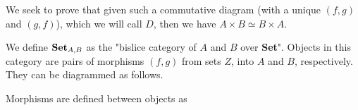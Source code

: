 
We seek to prove that given such a commutative diagram (with a unique $(f,g)$ and $(g,f)$), which we will call $D$, then we have $A \times B \simeq B \times A$.

We define $\text{\textbf{Set}}_{A,B}$ as the "bislice category of $A$ and $B$ over \textbf{Set}". Objects in this category are pairs of morphisms $(f,g)$ from sets $Z$, into $A$ and $B$, respectively. They can be diagrammed as follows.


Morphisms are defined between objects as

